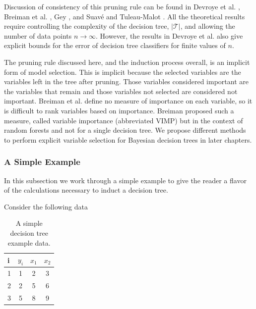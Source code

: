 Discussion of consistency of this pruning rule can be found in Devroye et al. \cite{devroye1996probabilistic}, Breiman et al. \cite{breiman1984classification}, Gey \cite{gey2005model}, and Suav\'{e} and Tuleau-Malot \cite{sauve2011variable}. All the theoretical results require controlling the complexity of the decision tree, $\vert\mathcal{T}\vert$, and allowing the number of data points $n\to\infty$. However, the results in Devroye et al. \cite{devroye1996probabilistic} also give explicit bounds for the error of decision tree classifiers for finite values of $n$. 

The pruning rule discussed here, and the induction process overall, is an implicit form of model selection. This is implicit because the selected variables are the variables left in the tree after pruning. Those variables considered important are the variables that remain and those variables not selected are considered not important. Breiman et al. \cite{breiman1984classification} define no measure of importance on each variable, so it is difficult to rank variables based on importance. Breiman \cite{breiman2001random} proposed such a measure, called variable importance (abbreviated VIMP)  but in the context of random forests and not for a single decision tree. We propose different methods to perform explicit variable selection for Bayesian decision trees in later chapters.   

\subsubsection{A Simple Example}

In this subsection we work through a simple example to give the reader a flavor of the calculations necessary to induct a decision tree. 

Consider the following data 

\begin{table}[H]
\begin{center}
\begin{tabular}{ l | c | c | c }
  i& $y_i$ & $x_1$ & $x_2$\\
  \hline
  1&1 & 2 & 3 \\
  2&2 & 5 & 6 \\
  3&5 & 8 & 9 \\
\end{tabular}
\caption[A simple decision tree example data]{A simple decision tree example data.}
\label{fig:dtree_firststep}
\end{center}
\end{table}

